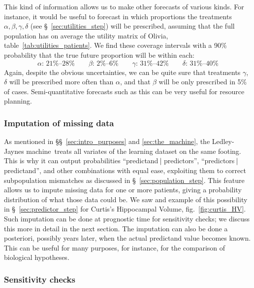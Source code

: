 \documentclass[utf8]{FrontiersinHarvard} %
\newcommand*{\sect}{\S}%
\newcommand*{\sects}{\S\S}%
\newcommand*{\fig}{fig.}%
\renewcommand*{\|}[1][]{\nonscript\:#1\vert\nonscript\:\mathopen{}}
\newcommand*{\ljm}{Ledley-Jaynes machine}
\begin{document}
This kind of information allows us to make other forecasts of various kinds. For instance, it would be useful to forecast in which proportions the treatments $\alpha,\beta,\gamma,\delta$ (see \sect~\ref{sec:utilities_step}) will be prescribed, assuming that the full population has on average the utility matrix of Olivia, table~\ref{tab:utilities_patients}. We find these coverage intervals with a 90\% probability that the true future proportion will be within each:
\begin{equation}
  \label{eq:ranges_future_treatments}
  \alpha\text{: 21\%--28\%}\qquad
  \beta\text{: 2\%--6\%}\qquad
  \gamma\text{: 31\%--42\%}\qquad
  \delta\text{: 31\%--40\%}
\end{equation}
Again, despite the obvious uncertainties, we can be quite sure that treatments $\gamma$, $\delta$ will be prescribed more often than $\alpha$, and that $\beta$ will be only prescribed in 5\% of cases. Semi-quantitative forecasts such as this can be very useful for resource planning.

\subsubsection{Imputation of missing data}
\label{sec:missing_data}

As mentioned in \sects~\ref{sec:intro_purposes} and \ref{sec:the_machine}, the \ljm\ treats all variates of the learning dataset on the same footing. This is why it can output probabilities \enquote{predictand$\|$predictors}, \enquote{predictors$\|$predictand}, and other combinations with equal ease, exploiting them to correct subpopulation mismatches as discussed in \sect~\ref{sec:population_step}. This feature allows us to impute missing data for one or more patients, giving a probability distribution of what those data could be. We saw and example of this possibility in \sect~\ref{sec:predictor_step} for Curtis's Hippocampal Volume, \fig~\ref{fig:curtis_HV}. Such imputation can be done at prognostic time for sensitivity checks; we discuss this more in detail in the next section. The imputation can also be done a posteriori, possibly years later, when the actual predictand value becomes known. This can be useful for many purposes, for instance, for the comparison of biological hypotheses.


\subsubsection{Sensitivity checks}
\label{sec:sensitivity}
\end{document}
